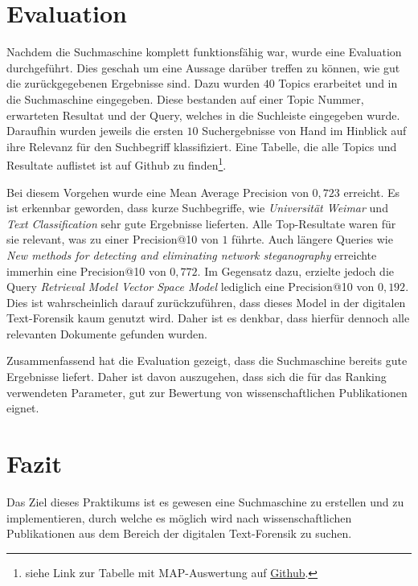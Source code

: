 \section{Evaluation}


Nachdem die Suchmaschine komplett funktionsfähig war, wurde eine
Evaluation durchgeführt. Dies geschah um eine Aussage darüber treffen
zu können, wie gut die zurückgegebenen Ergebnisse sind.
Dazu wurden $40$ Topics erarbeitet und in die Suchmaschine
eingegeben. Diese bestanden auf einer Topic Nummer, erwarteten
Resultat und der Query, welches in die Suchleiste eingegeben
wurde. Daraufhin wurden jeweils die ersten $10$ Suchergebnisse von Hand
im Hinblick auf ihre Relevanz für den Suchbegriff klassifiziert. Eine
Tabelle, die alle Topics und Resultate auflistet ist auf Github
zu finden\footnote{siehe Link zur Tabelle mit MAP-Auswertung auf
\href{https://github.com/43ndr1k/Digital-Text-Forensics/blob/develop/topics/mean_average_precision.ods}{Github}.}.

Bei diesem Vorgehen wurde eine Mean Average Precision von $0,723$
erreicht.  Es ist erkennbar geworden, dass kurze Suchbegriffe, wie
\emph{Universität Weimar} und \emph{Text Classification} sehr gute
Ergebnisse lieferten. Alle Top-Resultate waren für sie relevant, was
zu einer Precision@10 von $1$ führte. Auch längere Queries wie
\emph{New methods for detecting and eliminating network
steganography} erreichte immerhin eine Precision@10 von $0,772$.
Im Gegensatz dazu, erzielte jedoch die Query \emph{Retrieval Model
Vector Space Model} lediglich eine Precision@10 von $0,192$. Dies ist
wahrscheinlich darauf zurückzuführen, dass dieses Model in der
digitalen Text-Forensik kaum genutzt wird. Daher ist es denkbar, dass
hierfür dennoch alle relevanten Dokumente gefunden wurden.

Zusammenfassend hat die Evaluation gezeigt, dass die Suchmaschine
bereits gute Ergebnisse liefert. Daher ist davon auszugehen, dass sich
die für das Ranking verwendeten Parameter, gut zur Bewertung von
wissenschaftlichen Publikationen eignet.

\section{Fazit}

Das Ziel dieses Praktikums ist es gewesen eine Suchmaschine zu
erstellen und zu implementieren, durch welche es möglich wird nach
wissenschaftlichen Publikationen aus dem Bereich der digitalen
Text-Forensik zu suchen.

